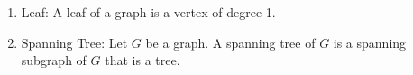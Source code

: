 \documentclass{article}
\begin{document}
\begin{enumerate}
    \item Leaf: A leaf of a graph is a vertex of degree 1.
    
    \item Spanning Tree: Let $G$ be a graph.
    A spanning tree of $G$ is a spanning subgraph of $G$ that is a tree.
    
\end{enumerate}
\end{document}
